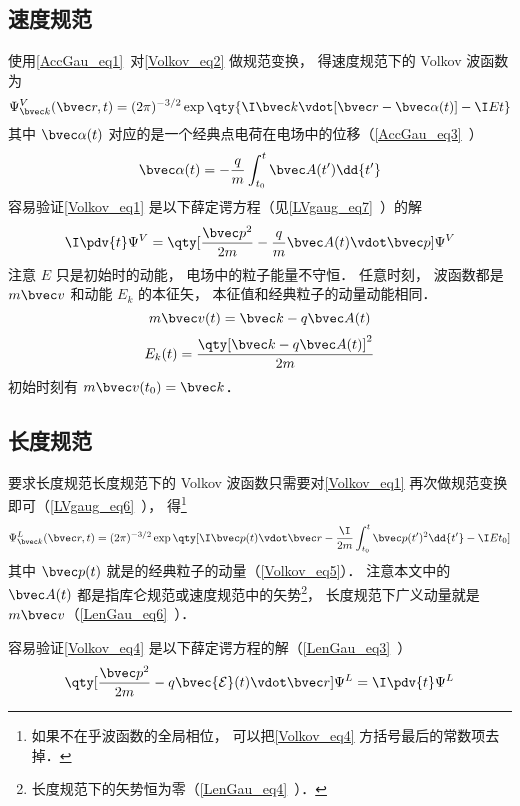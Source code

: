 \subsection{速度规范}
使用\autoref{AccGau_eq1}~对\autoref{Volkov_eq2} 做规范变换， 得速度规范下的 Volkov 波函数为
\begin{equation}\label{Volkov_eq1}
\Psi_{\bvec k}^V(\bvec r, t) = (2\pi)^{-3/2} \exp\qty{\I \bvec k \vdot [\bvec r - \bvec \alpha(t)] - \I E t}
\end{equation}
其中 $\bvec \alpha(t)$ 对应的是一个经典点电荷在电场中的位移（\autoref{AccGau_eq3}~）
\begin{equation}
\bvec \alpha(t) = -\frac{q}{m} \int_{t_0}^t \bvec A(t') \dd{t'}
\end{equation}
容易验证\autoref{Volkov_eq1} 是以下薛定谔方程（见\autoref{LVgaug_eq7}~）的解
\begin{equation}
\I \pdv{t} \Psi^V = \qty[\frac{\bvec p^2}{2m} - \frac{q}{m}\bvec A(t) \vdot \bvec p] \Psi^V
\end{equation}
注意 $E$ 只是初始时的动能， 电场中的粒子能量不守恒． 任意时刻， 波函数都是 $m\bvec v$ 和动能 $E_k$ 的本征矢， 本征值和经典粒子的动量动能相同．
\begin{equation}\label{Volkov_eq5}
m\bvec v(t) = \bvec k - q\bvec A(t)
\end{equation}
\begin{equation}
E_k(t) = \frac{\qty[\bvec k - q\bvec A(t)]^2}{2m}
\end{equation}
初始时刻有 $ m\bvec v(t_0) = \bvec k$．

\subsection{长度规范}
要求长度规范长度规范下的 Volkov 波函数只需要对\autoref{Volkov_eq1} 再次做规范变换即可（\autoref{LVgaug_eq6}~）， 得\footnote{如果不在乎波函数的全局相位， 可以把\autoref{Volkov_eq4} 方括号最后的常数项去掉．}
\begin{equation}\label{Volkov_eq4}
\Psi_{\bvec k}^L(\bvec r, t) = (2\pi)^{-3/2} \exp\qty[\I \bvec p(t)\vdot \bvec r - \frac{\I}{2m}\int_{t_0}^t \bvec p(t')^2 \dd{t'} - \I E t_0]
\end{equation}
其中 $\bvec p(t)$ 就是的经典粒子的动量（\autoref{Volkov_eq5}）． 注意本文中的 $\bvec A(t)$ 都是指库仑规范或速度规范中的矢势\footnote{长度规范下的矢势恒为零（\autoref{LenGau_eq4}~）．}， 长度规范下广义动量就是 $m\bvec v$（\autoref{LenGau_eq6}~）．

容易验证\autoref{Volkov_eq4} 是以下薛定谔方程的解（\autoref{LenGau_eq3}~）
\begin{equation}
\qty[\frac{\bvec p^2}{2m} - q \bvec {\mathcal E}(t) \vdot \bvec r] \Psi^L = \I \pdv{t} \Psi^L
\end{equation}
